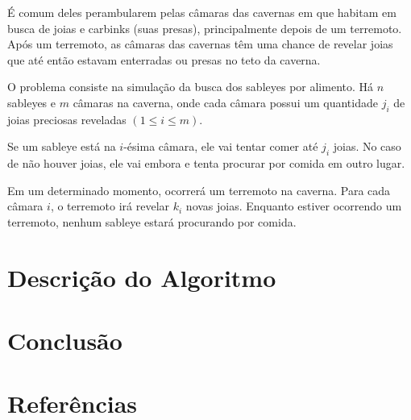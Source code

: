 \documentclass{article}
\begin{document}
É comum deles perambularem pelas câmaras das cavernas em que habitam em busca de joias e carbinks (suas presas), principalmente depois de um terremoto. Após um terremoto, as câmaras das cavernas têm uma chance de revelar joias que até então estavam enterradas ou presas no teto da caverna.

O problema consiste na simulação da busca dos sableyes por alimento. Há $n$ sableyes e $m$ câmaras na caverna, onde cada câmara possui um quantidade $j_i$ de joias preciosas reveladas $(1 \leq i \leq m)$.

Se um sableye está na $i$-ésima câmara, ele vai tentar comer até $j_i$ joias. No caso de não houver joias, ele vai embora e tenta procurar por comida em outro lugar.

Em um determinado momento, ocorrerá um terremoto na caverna. Para cada câmara $i$, o terremoto irá revelar $k_i$ novas joias. Enquanto estiver ocorrendo um terremoto, nenhum sableye estará procurando por comida.

\section{Descrição do Algoritmo}

\section{Conclusão}

\section{Referências}
\end{document}
